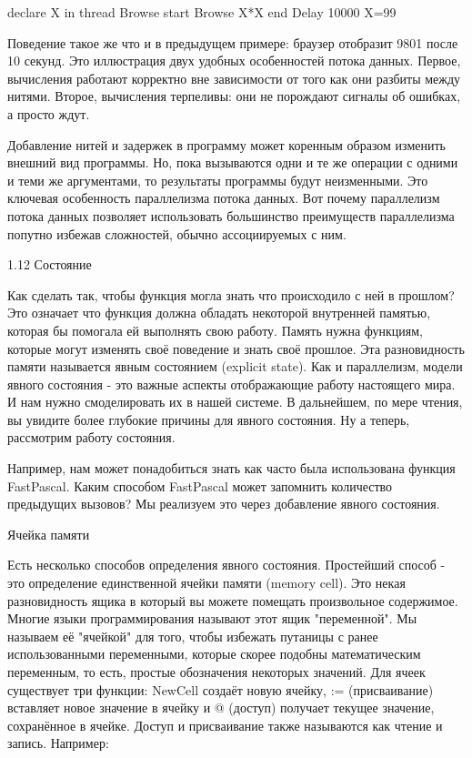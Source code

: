 declare X in
thread {Browse start} {Browse X*X} end
{Delay 10000} X=99

Поведение такое же что и в предыдущем примере: браузер отобразит 9801 после 10 секунд. Это иллюстрация двух удобных особенностей потока данных. Первое, вычисления работают корректно вне зависимости от того как они разбиты между нитями. Второе, вычисления терпеливы: они не порождают сигналы об ошибках, а просто ждут.

Добавление нитей и задержек в программу может коренным образом изменить внешний вид программы. Но, пока вызываются одни и те же операции с одними и теми же аргументами, то результаты программы будут неизменными. Это ключевая особенность параллелизма потока данных. Вот почему параллелизм потока данных позволяет использовать большинство преимуществ параллелизма попутно избежав сложностей, обычно ассоциируемых с ним.

1.12 Состояние

Как сделать так, чтобы функция могла знать что происходило с ней в прошлом? Это означает что функция должна обладать некоторой внутренней памятью, которая бы помогала ей выполнять свою работу. Память нужна функциям, которые могут изменять своё поведение и знать своё прошлое. Эта разновидность памяти называется явным состоянием (explicit state). Как и параллелизм, модели явного состояния - это важные аспекты отображающие работу настоящего мира. И нам нужно смоделировать их в нашей системе. В дальнейшем, по мере чтения, вы увидите более глубокие причины для явного состояния. Ну а теперь, рассмотрим работу состояния.

Например, нам может понадобиться знать как часто была использована функция FastPascal. Каким способом FastPascal может запомнить количество предыдущих вызовов? Мы реализуем это через добавление явного состояния.

Ячейка памяти

Есть несколько способов определения явного состояния. Простейший способ - это определение единственной ячейки памяти (memory cell). Это некая разновидность ящика в который вы можете помещать произвольное содержимое. Многие языки программирования называют этот ящик "переменной". Мы называем её "ячейкой" для того, чтобы избежать путаницы с ранее использованными переменными, которые скорее подобны математическим переменным, то есть, простые обозначения некоторых значений. Для ячеек существует три функции: NewCell создаёт новую ячейку, := (присваивание) вставляет новое значение в ячейку и @ (доступ) получает текущее значение, сохранённое в ячейке. Доступ и присваивание также называются как чтение и запись. Например:

